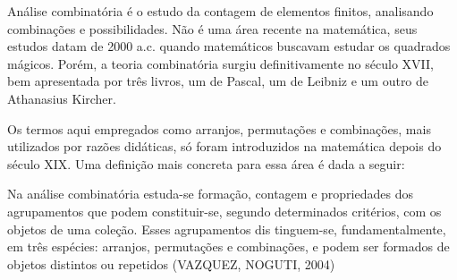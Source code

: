 Análise combinatória é o estudo da contagem de elementos finitos, analisando combinações e possibilidades. Não é uma área recente na matemática, seus estudos datam de 2000 a.c. quando matemáticos buscavam estudar os quadrados mágicos. Porém, a teoria combinatória surgiu definitivamente no século XVII, bem apresentada por três livros, um de Pascal, um de Leibniz e um outro de Athanasius Kircher.

Os termos aqui empregados como arranjos, permutações e combinações, mais utilizados por razões didáticas, só foram introduzidos na matemática depois do século XIX. Uma definição mais concreta para essa área é dada a seguir:

\begin{citacao}
	Na  análise  combinatória  estuda-se  formação,  contagem  e  propriedades  dos  
	agrupamentos que podem constituir-se, segundo determinados critérios, com os objetos 
	de   uma   coleção.   Esses   agrupamentos   dis
	tinguem-se,   fundamentalmente,   em   três   
	espécies: 
	arranjos,  permutações  e  combinações,
	e  podem  ser  formados  de  objetos  
	distintos ou repetidos (VAZQUEZ, NOGUTI, 2004)
\end{citacao}



